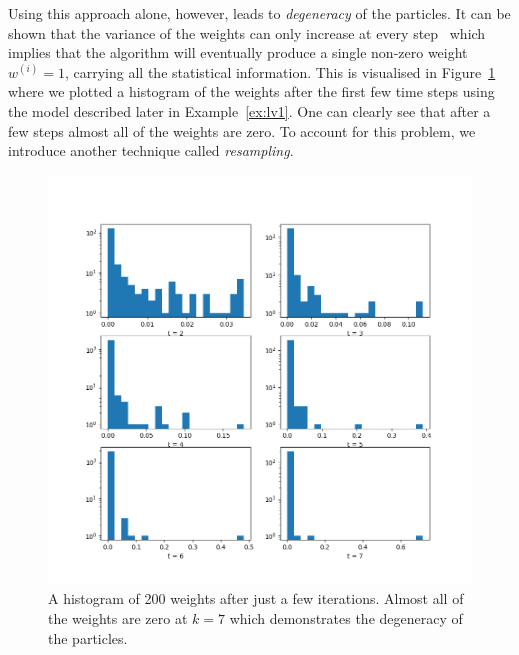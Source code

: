 Using this approach alone, however, leads to \emph{degeneracy} of the
particles. It can be shown that the variance of the weights can only
increase at every step~\cite[Proposition 1]{Doucet2000} which implies
that the algorithm will eventually produce a single non-zero weight
$w^{(i)} = 1$, carrying all the statistical information. This is
visualised in Figure~\ref{fig:weights} where we plotted a histogram of
the weights after the first few time steps using the model described
later in Example~\ref{ex:lv1}. One can clearly see that after a few
steps almost all of the weights are zero. To account for this problem,
we introduce another technique called \emph{resampling}.
\begin{figure}
  \centering
  \includegraphics[width=\textwidth]{figures/Figure_weights.png}
  \caption{A histogram of 200 weights after just a few
    iterations. Almost all of the weights are zero at $k = 7$ which
    demonstrates the degeneracy of the particles.}%
  \label{fig:weights}
\end{figure}

